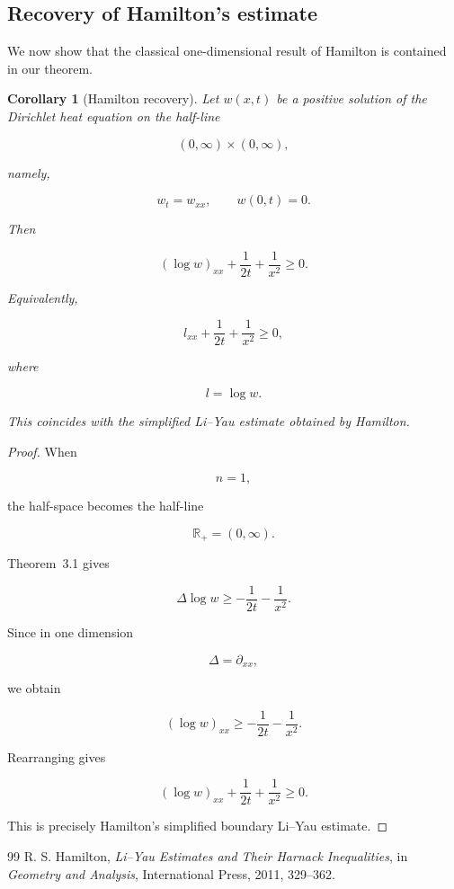\documentclass[10pt,a4paper]{amsart}
\newtheorem{corollary}[theorem]{Corollary}
\begin{document}
\subsection{Recovery of Hamilton's estimate}


We now show that the classical one-dimensional result of Hamilton is
contained in our theorem.


\begin{corollary}[Hamilton recovery]

Let $w(x,t)$ be a positive solution of the Dirichlet heat equation
on the half-line

\[
(0,\infty)\times(0,\infty),
\]

namely,

\[
w_t=w_{xx},
\qquad
w(0,t)=0 .
\]


Then

\[
(\log w)_{xx}
+
\frac1{2t}
+
\frac1{x^2}
\geq0 .
\]

Equivalently,

\[
\boxed{
l_{xx}
+
\frac1{2t}
+
\frac1{x^2}
\geq0 ,
}
\]

where

\[
l=\log w .
\]

This coincides with the simplified Li--Yau estimate obtained by
Hamilton.

\end{corollary}



\begin{proof}


When

\[
n=1,
\]

the half-space becomes the half-line

\[
\mathbb R_+=(0,\infty).
\]

Theorem~3.1 gives

\[
\Delta\log w
\geq
-\frac1{2t}
-\frac1{x^2}.
\]

Since in one dimension

\[
\Delta=\partial_{xx},
\]

we obtain

\[
(\log w)_{xx}
\geq
-\frac1{2t}
-\frac1{x^2}.
\]

Rearranging gives

\[
(\log w)_{xx}
+
\frac1{2t}
+
\frac1{x^2}
\geq0 .
\]

This is precisely Hamilton's simplified boundary Li--Yau
estimate.

\end{proof}

\begin{thebibliography}{99}
 R. S. Hamilton, \textit{Li--Yau Estimates and Their Harnack Inequalities}, in \textit{Geometry and Analysis}, International Press, 2011, 329--362.
\end{thebibliography}
\end{document}
